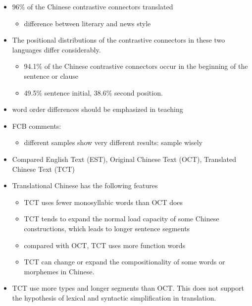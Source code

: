 \documentclass[a4paper,landscape,headrule,footrule,dvips]{foils}
\begin{document}
\begin{CJK}{UTF8}{min}
\begin{itemize}
\item 96\% of the Chinese contrastive connectors translated
  \begin{itemize}
  \item difference between literary and news style
  \end{itemize}
\item  The positional distributions of the contrastive connectors in
these two languages differ considerably.
\begin{itemize}
\item  94.1\% of the Chinese contrastive connectors occur in the
beginning of the sentence or clause
\item 49.5\% sentence initial, 38.6\% second position.
\end{itemize}
\item word order differences should be emphasized in teaching
\item FCB comments:
  \begin{itemize}
  \item different samples show very different results: sample wisely
  \end{itemize}
\end{itemize}



\begin{itemize}
\item Compared English Text (EST), Original Chinese Text (OCT),
  Translated Chinese Text (TCT)
\item Translational Chinese has the following features
  \begin{itemize}
  \item TCT uses fewer monosyllabic words than OCT does
  \item TCT tends to expand the normal load capacity of some Chinese constructions,
which leads to longer sentence segments
\item compared with OCT, TCT uses more function words
\item TCT can change or expand the compositionality of some words or morphemes in
Chinese.
\end{itemize}
\item TCT use more types and longer segments than OCT. This does not
  support the hypothesis of lexical and syntactic simplification in translation.
\end{itemize}


\end{CJK}
\end{document}
